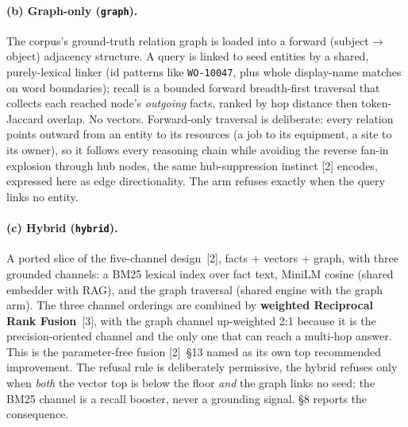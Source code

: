 \documentclass[11pt]{article}
\newcommand{\arm}[1]{\texttt{#1}}
\begin{document}
\paragraph{(b) Graph-only (\arm{graph}).} The corpus's ground-truth relation graph is loaded
into a forward (subject$\rightarrow$object) adjacency structure. A query is linked to seed
entities by a shared, purely-lexical linker (id patterns like \texttt{WO-10047}, plus whole
display-name matches on word boundaries); recall is a bounded forward breadth-first traversal
that collects each reached node's \emph{outgoing} facts, ranked by hop distance then
token-Jaccard overlap. No vectors. Forward-only traversal is deliberate: every relation
points outward from an entity to its resources (a job to its equipment, a site to its owner),
so it follows every reasoning chain while avoiding the reverse fan-in explosion through hub
nodes, the same hub-suppression instinct [2] encodes, expressed here as edge directionality.
The arm refuses exactly when the query links no entity.

\paragraph{(c) Hybrid (\arm{hybrid}).} A ported slice of the five-channel design~[2], facts
$+$ vectors $+$ graph, with three grounded channels: a BM25 lexical index over fact text, MiniLM cosine (shared embedder with RAG), and the graph traversal (shared engine with the
graph arm). The three channel orderings are combined by \textbf{weighted Reciprocal Rank
Fusion}~[3], with the graph channel up-weighted 2:1 because it is the precision-oriented
channel and the only one that can reach a multi-hop answer. This is the parameter-free fusion
[2]~\S13 named as its own top recommended improvement. The refusal rule is deliberately
permissive, the hybrid refuses only when \emph{both} the vector top is below the floor
\emph{and} the graph links no seed; the BM25 channel is a recall booster, never a grounding
signal. \S8 reports the consequence.
\end{document}
